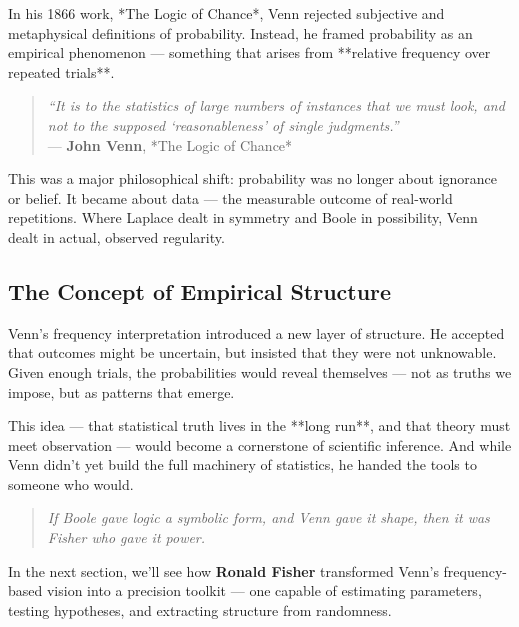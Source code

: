 In his 1866 work, *The Logic of Chance*, Venn rejected subjective and metaphysical definitions of probability. Instead, he framed probability as an empirical phenomenon — something that arises from **relative frequency over repeated trials**.

\begin{quote}
\textit{“It is to the statistics of large numbers of instances that we must look, and not to the supposed ‘reasonableness’ of single judgments.”} \\
— \textbf{John Venn}, *The Logic of Chance*
\end{quote}

This was a major philosophical shift: probability was no longer about ignorance or belief. It became about data — the measurable outcome of real-world repetitions. Where Laplace dealt in symmetry and Boole in possibility, Venn dealt in actual, observed regularity.

\subsection{The Concept of Empirical Structure}

Venn’s frequency interpretation introduced a new layer of structure. He accepted that outcomes might be uncertain, but insisted that they were not unknowable. Given enough trials, the probabilities would reveal themselves — not as truths we impose, but as patterns that emerge.

This idea — that statistical truth lives in the **long run**, and that theory must meet observation — would become a cornerstone of scientific inference. And while Venn didn’t yet build the full machinery of statistics, he handed the tools to someone who would.

\begin{quote}
\textit{If Boole gave logic a symbolic form, and Venn gave it shape, then it was Fisher who gave it power.}
\end{quote}

\medskip

In the next section, we’ll see how \textbf{Ronald Fisher} transformed Venn’s frequency-based vision into a precision toolkit — one capable of estimating parameters, testing hypotheses, and extracting structure from randomness.

